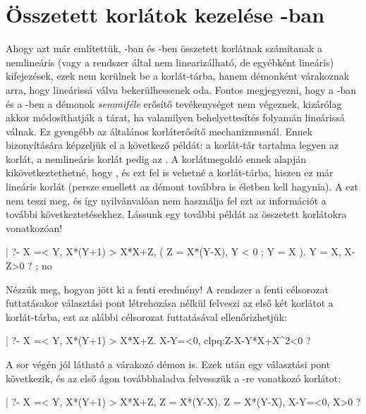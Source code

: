 \section{Összetett korlátok kezelése \Clpq-ban}

Ahogy azt már említettük, \Clpq-ban és \Clpr-ben összetett korlátnak
számítanak a nemlineáris (vagy a rendszer által nem linearizálható, de
egyébként lineáris) kifejezések, ezek nem kerülnek be a korlát-tárba, hanem
démonként várakoznak arra, hogy lineárissá válva bekerülhessenek oda.
Fontos megjegyezni, hogy a \Clpq-ban és a \Clpr-ben a démonok
\emph{semmiféle} erősítő tevékenységet nem végeznek, kizárólag akkor
módosíthatják a tárat, ha valamilyen behelyettesítés folyamán lineárissá
válnak. Ez gyengébb az általános korláterősítő mechanizmusnál. Ennek
bizonyítására képzeljük el a következő példát: a korlát-tár tartalma legyen
az  korlát, a nemlineáris korlát pedig az . A
korlátmegoldó ennek alapján kikövetkeztethetné, hogy , és ezt
fel is vehetné a korlát-tárba, hiszen ez már lineáris korlát (persze emellett
az  démont továbbra is életben kell hagynia). A  ezt
nem teszi meg, és így nyilvánvalóan nem használja fel ezt az információt
a további következtetésekhez.
\br
Lássunk egy további példát az összetett korlátokra vonatkozóan!

\begin{prologcode}
| ?- {X =< Y}, {X*(Y+1) > X*X+Z}, 
       (   Z = X*(Y-X), {Y < 0}
       ;   Y = X
       ).
                        Y = X,  {X-Z>0} ? ; no
\end{prologcode}

Nézzük meg, hogyan jött ki a fenti eredmény! A rendszer a fenti célsorozat
futtatásakor választási pont létrehozása nélkül felveszi az első két korlátot
a korlát-tárba, ezt az alábbi célsorozat futtatásával ellenőrizhetjük:

\begin{prologcode}
| ?- {X =< Y}, {X*(Y+1) > X*X+Z}.
                        {X-Y=<0}, clpq:{Z-X-Y*X+X^2<0} ?
\end{prologcode}

A sor végén jól látható a várakozó démon is. Ezek után egy választási pont
következik, és az első ágon továbbhaladva felvesszük a -re vonatkozó
korlátot:

\begin{prologcode}
| ?- {X =< Y}, {X*(Y+1) > X*X+Z}, Z = X*(Y-X).
                        Z = X*(Y-X), {X-Y=<0}, {X>0} ? 
\end{prologcode}

